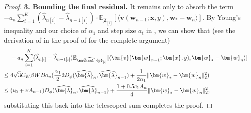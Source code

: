 \documentclass[11pt]{article}
\numberwithin{thm}{section}
\theoremstyle{plain}
\theoremstyle{definition}
\theoremstyle{remark} \newtheorem{remark}[thm]{Remark}
\def\vlambda{{\bm{\lambda}}}
\def\vv{{\bm{v}}}
\def\vw{{\bm{w}}}
\def\vx{{\bm{x}}}
\def\ep{\widehat{\mathcal{p}}}
\newcommand{\E}{\mathbb{E}}
\newcommand{\innp}[1]{\langle #1 \rangle}
\newcommand{\epi}{\ep_{[i]}}
\newcommand{\elambda}{\widehat{\lambda}}
\newcommand{\evlambda}{\widehat{\vlambda}}
\begin{document}
\begin{proof}
	\textbf{3. Bounding the final residual.}
	It remains only to absorb the term \(-a_n\sum_{i=1}^K(\elambda_{n[i]}-\elambda_{n-1[i]})\cdot\allowbreak\E_{\epi}[\innp{\vv(\vw_{n-1};\vx,y), \vw_*-\vw_n}]\).
	By Young's inequality and our choice of \(\alpha_1\) and step size \(a_t\) in ,
    we can show that (see the derivation of  in the proof of  for the complete argument)
	\begin{align}\label{eq:final-residual}
		&-a_n\sum_{i=1}^K(\elambda_{n[i]}-\elambda_{n-1[i]})\E_{\epi}[\innp{\vv(\vw_{n-1};\vx,y), \vw_*-\vw_n}]\notag \\
		\leq \;& 4\sqrt{3}C_W\beta WB a_n(\frac{\alpha_1}{2}2D_{\phi}(\evlambda_n,\evlambda_{n-1})+\frac{1}{2\alpha_1}\|\vw_*-\vw_n\|_2^2) \notag\\
		\leq \;& (\nu_0+\nu A_{n-1})D_{\phi}(\evlambda_n, \evlambda_{n-1})+\frac{1+0.5c_1A_n}{4}\|\vw_*-\vw_{n}\|_2^2, 
	\end{align}
	substituting this back into the telescoped sum completes the proof.
\end{proof}
\end{document}
